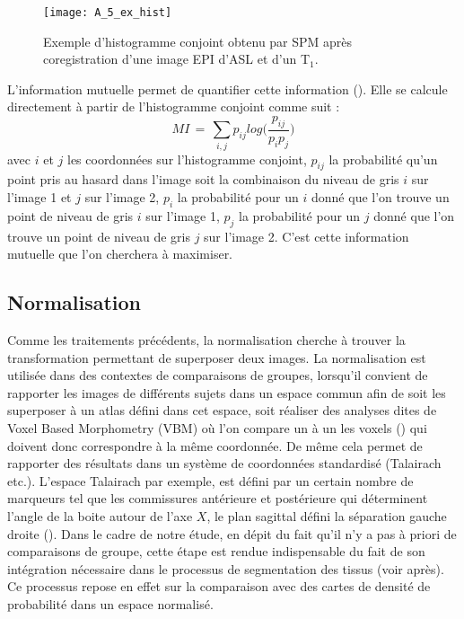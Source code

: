 \begin{figure}[!t]
\centering
\texttt{[image: A\_5\_ex\_hist]}
\caption{Exemple d'histogramme conjoint obtenu par SPM après coregistration d'une image EPI d'ASL et d'un T$_1$.}
\label{fig:A_5_ex_hist}	
\end{figure}
L’information mutuelle permet de quantifier cette information (\cite{Collignon1995}). Elle se calcule directement à
partir de l’histogramme conjoint comme suit :
\begin{equation}
MI\,=\,\sum_{i,j}p_{ij}log\biggl(\frac{p_{ij}}{p_ip_j}\biggr)
\end{equation}
avec $i$ et $j$ les coordonnées sur l'histogramme conjoint, $p_{ij}$ la probabilité qu’un point pris au hasard dans
l’image soit la combinaison du niveau de gris $i$ sur l’image 1 et $j$ sur l’image 2, $p_i$ la probabilité pour un
$i$ donné que l’on trouve un point de niveau de gris $i$ sur l’image 1, $p_j$ la probabilité pour un $j$ donné que
l’on trouve un point de niveau de gris $j$ sur l’image 2. C’est cette information mutuelle que l’on
cherchera à maximiser.

\subsection{Normalisation}
Comme les traitements précédents, la normalisation cherche à trouver la transformation
permettant de superposer deux images. La normalisation est utilisée dans des contextes de
comparaisons de groupes, lorsqu’il convient de rapporter les images de différents sujets dans un
espace commun afin de soit les superposer à un atlas défini dans cet espace, soit réaliser des analyses
dites de Voxel Based Morphometry (VBM) où l’on compare un à un les voxels (\cite{Mechelli2005}) qui doivent donc
correspondre à la même coordonnée. De même cela permet de rapporter des résultats dans un
système de coordonnées standardisé (Talairach etc.). L’espace Talairach par exemple, est défini par un
certain nombre de marqueurs tel que les commissures antérieure et postérieure qui déterminent
l’angle de la boite autour de l’axe $X$, le plan sagittal défini la séparation gauche droite (\cite{Talairach1988}). Dans le cadre de notre étude, en dépit du fait qu’il n’y a pas à priori de comparaisons de groupe, cette étape
est rendue indispensable du fait de son intégration nécessaire dans le processus de segmentation des
tissus (voir après). Ce processus repose en effet sur la comparaison avec des cartes de densité de
probabilité dans un espace normalisé.

